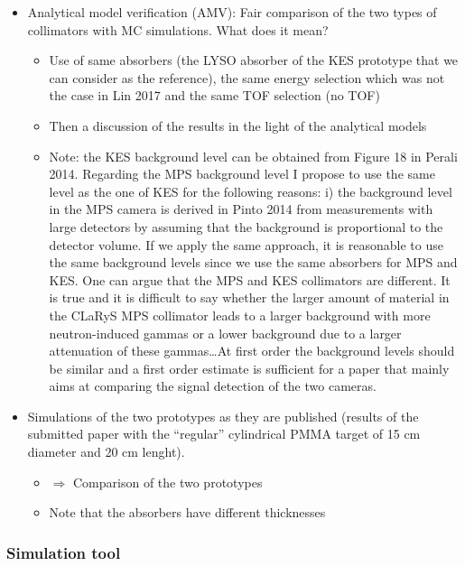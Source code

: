 \documentclass[a4paper,english]{article}
\begin{document}
\begin{itemize}
  \item Analytical model verification (AMV): Fair comparison of the two types of collimators with MC simulations. What does it mean? 
  \begin{itemize}
    \item Use of same absorbers (the LYSO absorber of the KES prototype that we can consider as the reference), the same energy selection which was not the case in Lin 2017 and the same TOF selection (no TOF)
    \item Then a discussion of the results in the light of the analytical models
    \item Note: the KES background level can be obtained from Figure 18 in
      Perali 2014. Regarding the MPS background level I propose to use the same
      level as the one of KES for the following reasons: i)
      the background level in the MPS camera is derived in Pinto 2014 from measurements with large detectors by assuming that the background is proportional to the detector volume. If we apply the same approach, it is reasonable to use the same background levels since we use the same absorbers for MPS and KES. One can argue that the MPS and KES collimators are different. It is true and it is difficult to say whether the larger amount of material in the CLaRyS MPS collimator leads to a larger background with more neutron-induced gammas or a lower background due to a larger attenuation of these gammas\dots At first order the background levels should be similar and a first order estimate is sufficient for a paper that mainly aims at comparing the signal detection of the two cameras.
  \end{itemize}    
  \item Simulations of the two prototypes as they are published (results of the submitted paper with the \enquote{regular} cylindrical PMMA target of 15 cm diameter and 20 cm lenght). 
  \begin{itemize}
    \item $\Rightarrow$ Comparison of the two prototypes
    \item Note that the absorbers have different thicknesses
  \end{itemize}     
\end{itemize}

\subsubsection{Simulation tool}
\end{document}
